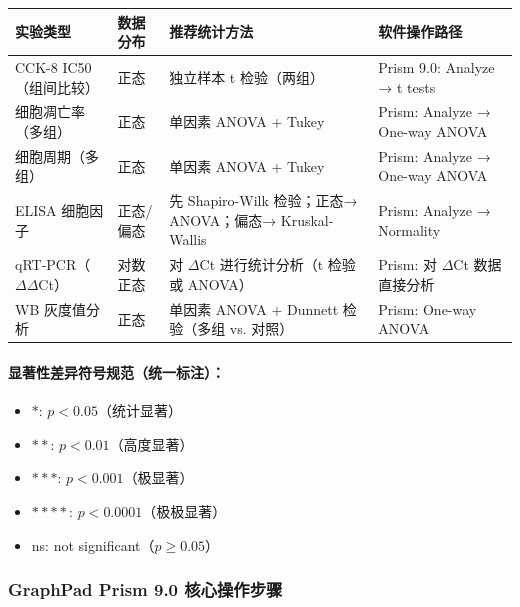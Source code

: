 \documentclass[12pt,a4paper,twoside]{article}
\begin{document}
\begin{center}
\begin{tabular}{p{3.5cm}p{3cm}p{3.5cm}p{4cm}}
\toprule
\textbf{实验类型} & \textbf{数据分布} & \textbf{推荐统计方法} & \textbf{软件操作路径} \\
\midrule
CCK-8 IC50（组间比较）& 正态 & 独立样本 t 检验（两组）& Prism 9.0: Analyze → t tests \\
\addlinespace
细胞凋亡率（多组）& 正态 & 单因素 ANOVA + Tukey & Prism: Analyze → One-way ANOVA \\
\addlinespace
细胞周期（多组）& 正态 & 单因素 ANOVA + Tukey & Prism: Analyze → One-way ANOVA \\
\addlinespace
ELISA 细胞因子 & 正态/偏态 & 先 Shapiro-Wilk 检验；正态→ ANOVA；偏态→ Kruskal-Wallis & Prism: Analyze → Normality \\
\addlinespace
qRT-PCR（$\Delta\Delta$Ct）& 对数正态 & 对 $\Delta$Ct 进行统计分析（t 检验或 ANOVA）& Prism: 对 $\Delta$Ct 数据直接分析 \\
\addlinespace
WB 灰度值分析 & 正态 & 单因素 ANOVA + Dunnett 检验（多组 vs. 对照）& Prism: One-way ANOVA \\
\bottomrule
\end{tabular}
\end{center}

\paragraph{显著性差异符号规范（统一标注）：}
\begin{itemize}
  \item $*$: $p < 0.05$（统计显著）
  \item $**$: $p < 0.01$（高度显著）
  \item $***$: $p < 0.001$（极显著）
  \item $****$: $p < 0.0001$（极极显著）
  \item ns: not significant（$p \geq 0.05$）
\end{itemize}

\subsubsection{GraphPad Prism 9.0 核心操作步骤}
\end{document}
